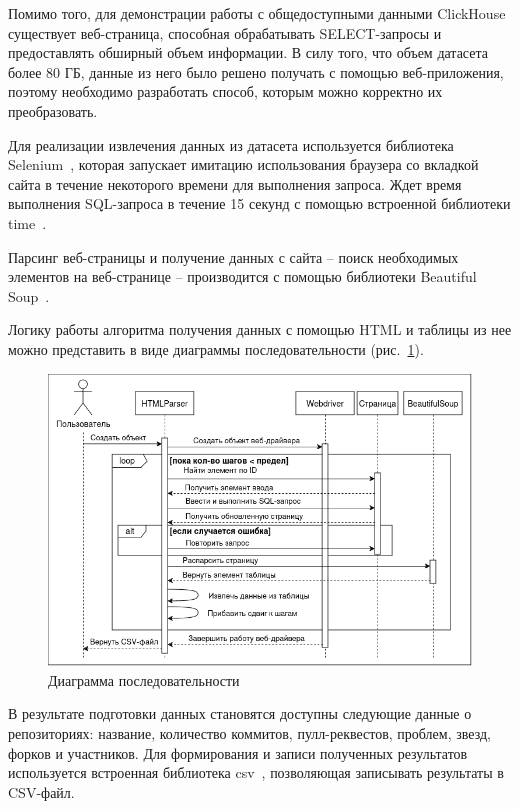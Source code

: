 Помимо того, для демонстрации работы с общедоступными данными ClickHouse существует веб-страница, способная обрабатывать SELECT-запросы и предоставлять обширный объем информации. В силу того, что объем датасета более 80 ГБ, данные из него было решено получать с помощью веб-приложения, поэтому необходимо разработать способ, которым можно корректно их преобразовать.

Для реализации извлечения данных из датасета используется библиотека Selenium~\cite{selenium}, которая запускает имитацию использования браузера со вкладкой сайта в течение некоторого времени для выполнения запроса. Ждет время выполнения SQL-запроса в течение 15 секунд с помощью встроенной библиотеки time~\cite{time}. 

Парсинг веб-страницы и получение данных с сайта -- поиск необходимых элементов на веб-странице -- производится с помощью библиотеки Beautiful Soup~\cite{beautifulsoup}. 

Логику работы алгоритма получения данных с помощью HTML и таблицы из нее можно представить в виде диаграммы последовательности (рис.~\ref{ris:sequence}).

\begin{figure}[h]
    \centering
    \includegraphics[width=1\linewidth]{pic/sequence.png}
    \vspace{0.2em}    \caption{Диаграмма последовательности}
    \label{ris:sequence}
\end{figure}
\vspace{1em}

В результате подготовки данных становятся доступны следующие данные о репозиториях: название, количество коммитов, пулл-реквестов, проблем, звезд, форков и участников. Для формирования и записи полученных результатов используется встроенная библиотека csv~\cite{csv}, позволяющая записывать результаты в CSV-файл.
\vspace{1em}

